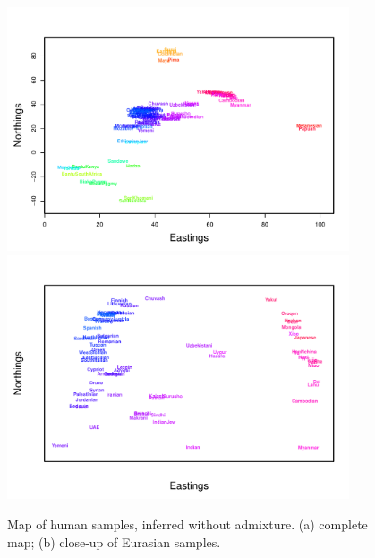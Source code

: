\documentclass[12pt]{article}
\begin{document}
\begin{figure}
	\centering
			{\includegraphics[width=0.9\textwidth,height=0.738\textwidth]{figs/globetrotter/globe_NoAd_map.pdf}}
			{\includegraphics[width=0.9\textwidth,height=0.738\textwidth]{figs/globetrotter/globe_Eurasia_NoAd_map_indproc.pdf}}
	\caption{Map of human samples, inferred without admixture. (a) complete map; (b) close-up of Eurasian 
samples.}\label{sfig:globe_noad_maps}
\end{figure}
\end{document}
